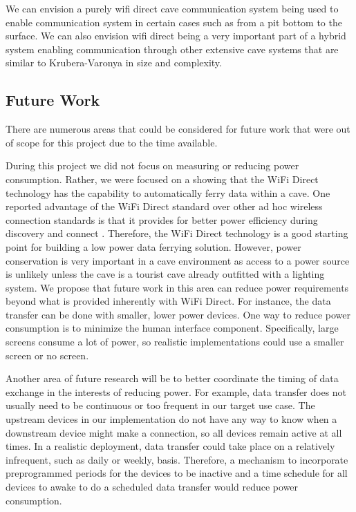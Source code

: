 \documentclass[10pt,twocolumn]{article}
\begin{document}
We can envision a purely wifi direct cave communication system being used to enable communication system in certain cases such as from a pit bottom to the surface.
We can also envision wifi direct being a very important part of a hybrid system enabling communication through other extensive cave systems that are similar to Krubera-Varonya in size and complexity. 

\subsection{Future Work}
\label{sec:Future Work}
There are numerous areas that could be considered for future work that were out of scope for this project due to the time available.

During this project we did not focus on measuring or reducing power consumption.
Rather, we were focused on a showing that the WiFi Direct technology has the capability to automatically ferry data within a cave.
One reported advantage of the WiFi Direct standard over other ad hoc wireless connection standards is that it provides for better power efficiency during discovery and connect \cite{wifiwhitepaper}.
Therefore, the WiFi Direct technology is a good starting point for building a low power data ferrying solution.
However, power conservation is very important in a cave environment as access to a power source is unlikely unless the cave is a tourist cave already outfitted with a lighting system.
We propose that future work in this area can reduce power requirements beyond what is provided inherently with WiFi Direct.
For instance, the data transfer can be done with smaller, lower power devices.
One way to reduce power consumption is to minimize the human interface component.
Specifically, large screens consume a lot of power, so realistic implementations could use a smaller screen or no screen.

Another area of future research will be to better coordinate the timing of data exchange in the interests of reducing power.
For example, data transfer does not usually need to be continuous or too frequent in our target use case.
The upstream devices in our implementation do not have any way to know when a downstream device might make a connection, 
so all devices remain active at all times.
In a realistic deployment, data transfer could take place on a relatively infrequent, such as daily or weekly, basis.
Therefore, a mechanism to incorporate preprogrammed periods for the devices to be inactive
and a time schedule for all devices to awake to do a scheduled data transfer would reduce power consumption.
\end{document}
